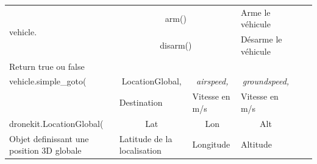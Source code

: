 \documentclass[a4paper, 10pt]{article}
\begin{document}
\begin{enumerate}
\begin{table}[]
\begin{tabular}{lcllll}
\multirow{2}{*}{vehicle.}                 & \multicolumn{2}{c}{arm()}                                                                                                                                                                                            & Arme le véhicule                                       &                       &  \\
                                          & \multicolumn{2}{c}{disarm()}                                                                                                                                                                                         & Désarme le véhicule                                    &                       &  \\
Return true ou false                      & \multicolumn{1}{l}{}                                                                                                &                                                                                                &                                                        &                       &  \\ \cline{1-5}
vehicle.simple\_goto(                     & LocationGlobal,                                                                                                     & \multicolumn{1}{c}{\textit{airspeed,}}                                                         & \multicolumn{1}{c}{\textit{groundspeed,}}              &                       &  \\
                                          & \multicolumn{1}{l}{Destination}                                                                                     & Vitesse en m/s                                                                                 & Vitesse en m/s                                         &                       &  \\ \cline{1-5}
dronekit.LocationGlobal(                  & Lat                                                                                                                 & \multicolumn{1}{c}{Lon}                                                                        & \multicolumn{1}{c}{Alt}                                &                       &  \\
Objet definissant une position 3D globale & \multicolumn{1}{l}{Latitude de la localisation}                                                                     & Longitude                                                                                      & Altitude                                               &                       &  \\ \cline{1-5}

\end{tabular}
\end{table}
\end{enumerate}
\end{document}
